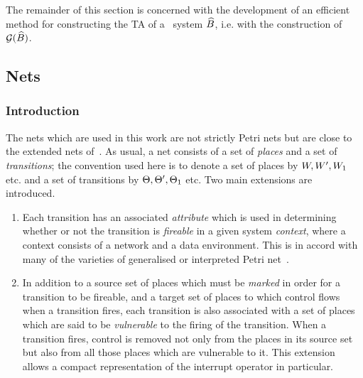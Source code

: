 The remainder of this section is concerned with the development of an
efficient method for constructing the TA of a \bcandle\ system ${\widehat{{B}}}$, i.e.  
with the construction of $\Gr(\csys)$.

\subsection{Nets} \label{ss:tgnets}
\subsubsection{Introduction}
The nets which are used in this work are not strictly Petri nets but
are close to the extended nets of~\cite{yov:93}. As usual, a net
consists of a set of \emph{places} and a set of \emph{transitions}; the
convention used here is to denote a set of places by $W,W',W_1$
etc. and a set of transitions by $\Theta,\Theta',\Theta_1$ etc. Two main
extensions are introduced.
\begin{enumerate}
\item Each transition has an associated \emph{attribute} which is used 
in determining whether or not the transition is \emph{fireable} in a
given system \emph{context}, where a context consists of a network and
a data environment. This is in accord with many of the varieties of
generalised or interpreted Petri net~\cite{kel:76,sif:77}.
\item In addition to a source set of places which must be \emph{marked} 
in order for a transition to be fireable, and a target set of places
to which control flows when a transition fires, each transition is
also associated with a set of places which are said to be
\emph{vulnerable} to the firing of the transition. When a transition
fires, control is removed not only from the places in its source set
but also from all those places which are vulnerable to it. This
extension allows a compact representation of the interrupt operator in
particular.
\end{enumerate} 

